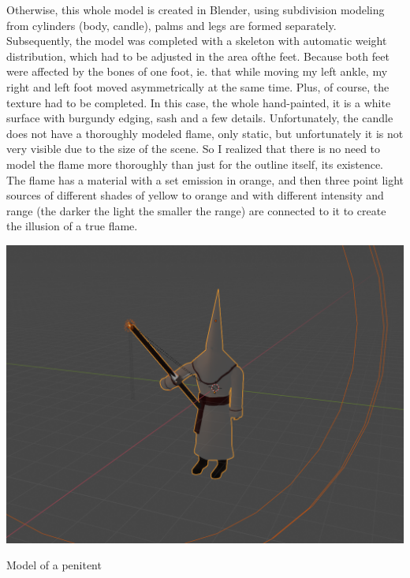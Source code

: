 \documentclass[12pt,a4paper,titlepage,final,tikz,border=4mm]{report}
\begin{document}
Otherwise, this whole model is created in Blender, using subdivision modeling from cylinders (body, candle), palms and legs are formed separately. Subsequently, the model was completed with a skeleton with automatic weight distribution, which had to be adjusted in the area of ​​the feet. Because both feet were affected by the bones of one foot, ie. that while moving my left ankle, my right and left foot moved asymmetrically at the same time. Plus, of course, the texture had to be completed. In this case, the whole hand-painted, it is a white surface with burgundy edging, sash and a few details. Unfortunately, the candle does not have a thoroughly modeled flame, only static, but unfortunately it is not very visible due to the size of the scene. So I realized that there is no need to model the flame more thoroughly than just for the outline itself, its existence. The flame has a material with a set emission in orange, and then three point light sources of different shades of yellow to orange and with different intensity and range (the darker the light the smaller the range) are connected to it to create the illusion of a true flame.
\begin {center}
\includegraphics [height = 10cm] {PenitenteModel.png}
\caption {Model of a penitent}
\end {center}
\end{document}

